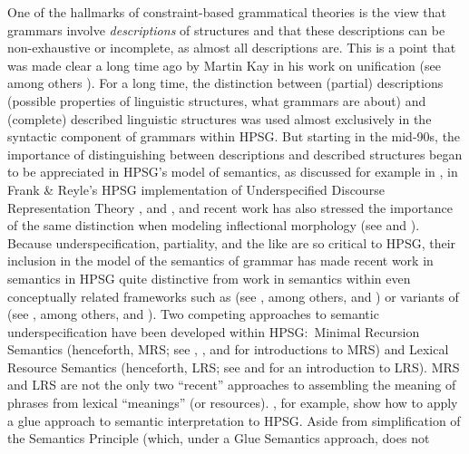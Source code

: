 \documentclass[output=paper
 	        ,biblatex
                ,babelshorthands
                ,newtxmath
                ,draftmode
                ,colorlinks, citecolor=brown
]{langscibook}
\begin{document}
One of the hallmarks of constraint-based grammatical theories is the view that grammars involve \emph{descriptions} of structures and that these descriptions can be non-exhaustive or incomplete, as almost all descriptions are.
This is a point that was made clear a long time ago by Martin Kay in his work on unification (see among others \citealt{Kay1979}). For a long time, the distinction between (partial) descriptions (possible properties of linguistic structures, what grammars are about) and (complete) described linguistic structures was used almost exclusively in the syntactic component of grammars within HPSG. But starting in the mid-90s, the importance of distinguishing between descriptions and described structures began to be appreciated in HPSG's model of semantics, as discussed for example in \citet{Nerbonne1993a}, in Frank \& Reyle's HPSG implementation of Underspecified Discourse Representation Theory \citep{FrankandReyle1992,FrankandReyle1995}, and \citet*{Copestakeetal1995}, and recent work has also stressed the importance of the same distinction when modeling inflectional morphology (see \citealt{CrysmannandBonami2016} and ). Because underspecification, partiality, and the like are so critical to HPSG, their inclusion in the model of the semantics of grammar has made recent work in semantics in HPSG quite distinctive from work in semantics within even conceptually related frameworks such as  (see \citealt{BK82a}, among others, and ) or variants of  (see \citealt{Steedman1996}, among others, and ). Two competing approaches to semantic underspecification have been developed within HPSG:\ Minimal Recursion Semantics (henceforth, MRS; see \citealt{Copestakeetal1995}, \citealt{Copestakeetal2001}, and \citealt{Copestakeetal2005} for introductions to MRS) and Lexical Resource Semantics (henceforth, LRS; see \citealt{RichterandSailer2004,RichterandSailer2001} and \citealt{IordachioaiaandRichter2015} for an introduction to LRS). MRS and LRS are not the only two ``recent'' approaches  to assembling the meaning of phrases from lexical ``meanings'' (or resources). \citet{AsudehandCrouch2002}, for example, show how to apply a glue approach to semantic interpretation to HPSG. Aside from simplification of the Semantics Principle (which, under a Glue Semantics approach, does not
\end{document}
